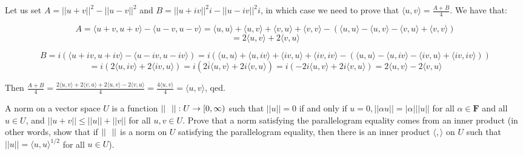 \begin{solution}

Let us set $A = \lvert \lvert u + v \rvert \rvert^2 - \lvert \lvert u - v \rvert \rvert^2$ and $B = \lvert \lvert u + iv \rvert \rvert^2 i - \lvert \lvert u - iv \rvert \rvert^2 i$, in which case we need to prove that $\langle u, v \rangle = \frac{A + B}{4}$. We have that:

$$A = \langle u + v, u + v\rangle - \langle u - v, u - v\rangle = \langle u, u \rangle + \langle u, v \rangle + \langle v, u \rangle + \langle v, v \rangle - (\langle u, u \rangle - \langle u, v \rangle - \langle v, u \rangle + \langle v, v \rangle) $$
$$= 2\langle u, v \rangle + 2\langle v, u \rangle$$

$$B = i(\langle u + iv, u + iv \rangle - \langle u - iv, u -iv \rangle) = i(\langle u, u \rangle + \langle u, iv \rangle + \langle iv, u \rangle + \langle iv, iv \rangle - (\langle u, u \rangle - \langle u, iv \rangle - \langle iv, u \rangle + \langle iv, iv \rangle))$$
$$= i(2\langle u, iv \rangle + 2 \langle iv, u \rangle) = i(2\overline{i}\langle u, v \rangle + 2i\langle v, u \rangle) = i(-2i\langle u, v \rangle + 2i\langle v, u \rangle) = 2 \langle u, v \rangle -2 \langle v, u \rangle$$

Then $\frac{A + B}{4} = \frac{2\langle u, v \rangle + 2\langle v, u \rangle + 2\langle u, v \rangle - 2\langle v, u \rangle}{4} = \frac{4\langle u, v \rangle}{4} = \langle u, v\rangle$, qed.
\end{solution}

\newpage
\begin{exercise}{21}
A norm on a vector space $U$  is a function $\lvert \lvert\hspace{0.25cm}\rvert \rvert : U \rightarrow [0, \infty)$ such that $\lvert \lvert u \rvert \rvert = 0$ if and only if $u = 0, \lvert \lvert \alpha u \rvert \rvert = \lvert \alpha \rvert \lvert \lvert u \rvert \rvert$ for all $\alpha \in \mathbf{F}$ and all $u \in U$, and $\lvert \lvert u + v \rvert \rvert \leq \lvert \lvert u \rvert \rvert + \lvert \lvert v \rvert \rvert$ for all $u, v \in U$. Prove that a norm satisfying the parallelogram equality comes from an inner product (in other words, show that if $\lvert \lvert \hspace{0.25cm} \rvert \rvert$ is a norm on $U$ satisfying the parallelogram equality, then there is an inner product $\langle, \rangle$ on $U$ such that $\lvert \lvert u \rvert \rvert = \langle u, u \rangle^{1/2}$ for all $u \in U$).
\end{exercise}

